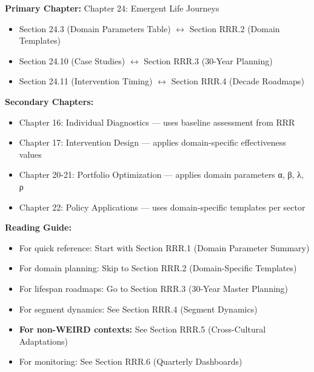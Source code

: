 \begin{tcolorbox}[colback=purple!5!white, colframe=purple!75!black, title=Chapter Linkage]

\textbf{Primary Chapter:} Chapter 24: Emergent Life Journeys
\begin{itemize}[nosep]
\item Section 24.3 (Domain Parameters Table) $\leftrightarrow$ Section RRR.2 (Domain Templates)
\item Section 24.10 (Case Studies) $\leftrightarrow$ Section RRR.3 (30-Year Planning)
\item Section 24.11 (Intervention Timing) $\leftrightarrow$ Section RRR.4 (Decade Roadmaps)
\end{itemize}

\textbf{Secondary Chapters:}
\begin{itemize}[nosep]
\item Chapter 16: Individual Diagnostics --- uses baseline assessment from RRR
\item Chapter 17: Intervention Design --- applies domain-specific effectiveness values
\item Chapter 20-21: Portfolio Optimization --- applies domain parameters α, β, λ, ρ
\item Chapter 22: Policy Applications --- uses domain-specific templates per sector
\end{itemize}

\textbf{Reading Guide:}
\begin{itemize}[nosep]
\item For quick reference: Start with Section RRR.1 (Domain Parameter Summary)
\item For domain planning: Skip to Section RRR.2 (Domain-Specific Templates)
\item For lifespan roadmaps: Go to Section RRR.3 (30-Year Master Planning)
\item For segment dynamics: See Section RRR.4 (Segment Dynamics)
\item \textbf{For non-WEIRD contexts:} See Section RRR.5 (Cross-Cultural Adaptations)
\item For monitoring: See Section RRR.6 (Quarterly Dashboards)
\end{itemize}

\end{tcolorbox}


